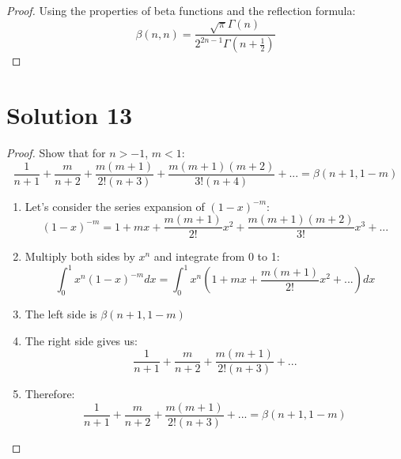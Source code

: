 \documentclass{article}
\begin{document}
\begin{proof}
Using the properties of beta functions and the reflection formula:
\[ \beta(n,n) = \frac{\sqrt{\pi}\Gamma(n)}{2^{2n-1}\Gamma(n+\frac{1}{2})} \]
\end{proof}

\section*{Solution 13}
\begin{proof}
Show that for $n > -1$, $m < 1$:
\[ \frac{1}{n+1} + \frac{m}{n+2} + \frac{m(m+1)}{2!(n+3)} + \frac{m(m+1)(m+2)}{3!(n+4)} + ... = \beta(n+1,1-m) \]

\begin{enumerate}
\item Let's consider the series expansion of $(1-x)^{-m}$:
\[ (1-x)^{-m} = 1 + mx + \frac{m(m+1)}{2!}x^2 + \frac{m(m+1)(m+2)}{3!}x^3 + ... \]

\item Multiply both sides by $x^n$ and integrate from 0 to 1:
\[ \int_0^1 x^n(1-x)^{-m}dx = \int_0^1 x^n(1 + mx + \frac{m(m+1)}{2!}x^2 + ...)dx \]

\item The left side is $\beta(n+1,1-m)$

\item The right side gives us:
\[ \frac{1}{n+1} + \frac{m}{n+2} + \frac{m(m+1)}{2!(n+3)} + ... \]

\item Therefore:
\[ \frac{1}{n+1} + \frac{m}{n+2} + \frac{m(m+1)}{2!(n+3)} + ... = \beta(n+1,1-m) \]
\end{enumerate}
\end{proof}
\end{document}

